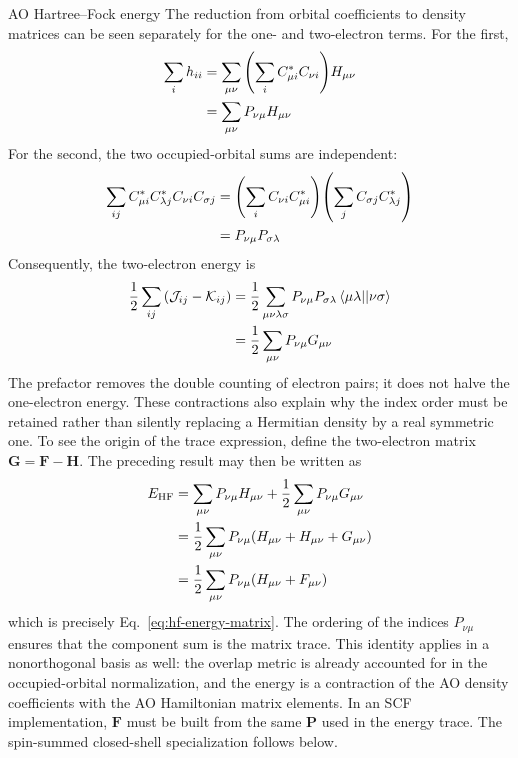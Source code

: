 \documentclass[11pt,a4paper,titlepage]{article}
\numberwithin{equation}{section}
\newcommand{\bF}{\boldsymbol{F}}
\newcommand{\bG}{\boldsymbol{G}}
\newcommand{\bH}{\boldsymbol{H}}
\newcommand{\bP}{\boldsymbol{P}}
\newcommand{\cJ}{\mathcal{J}}
\newcommand{\cK}{\mathcal{K}}
\begin{document}
\begin{hfsolution}{AO Hartree--Fock energy}
The reduction from orbital coefficients to density matrices can be seen
separately for the one- and two-electron terms. For the first,
\begin{equation}
\begin{split}
  \sum_i h_{ii}
  &=\sum_{\mu\nu}\qty(\sum_i C_{\mu i}^*C_{\nu i})H_{\mu\nu}\\
  &=\sum_{\mu\nu}P_{\nu\mu}H_{\mu\nu}
\end{split}
\end{equation}
For the second, the two occupied-orbital sums are independent:
\begin{equation}
\begin{split}
  \sum_{ij}C_{\mu i}^*C_{\lambda j}^*C_{\nu i}C_{\sigma j}
  &=\qty(\sum_i C_{\nu i}C_{\mu i}^*)
    \qty(\sum_j C_{\sigma j}C_{\lambda j}^*)\\
  &=P_{\nu\mu}P_{\sigma\lambda}
\end{split}
\end{equation}
Consequently, the two-electron energy is
\begin{equation}
\begin{split}
  \frac12\sum_{ij}\qty(\cJ_{ij}-\cK_{ij})
  &=\frac12\sum_{\mu\nu\lambda\sigma}
    P_{\nu\mu}P_{\sigma\lambda}\mel{\mu\lambda}{}{\nu\sigma}\\
  &=\frac12\sum_{\mu\nu}P_{\nu\mu}G_{\mu\nu}
\end{split}
\end{equation}
The prefactor removes the double counting of electron pairs; it does not
halve the one-electron energy. These contractions also explain why the
index order must be retained rather than silently replacing a Hermitian
density by a real symmetric one.
To see the origin of the trace expression, define the two-electron matrix
$\bG=\bF-\bH$. The preceding result may then be written as
\begin{equation}
\begin{split}
  E_\text{HF}
  &=
  \sum_{\mu\nu}P_{\nu\mu}H_{\mu\nu}
  +
  \frac12\sum_{\mu\nu}P_{\nu\mu}G_{\mu\nu}
  \\
  &=
  \frac12\sum_{\mu\nu}P_{\nu\mu}
  \qty(H_{\mu\nu}+H_{\mu\nu}+G_{\mu\nu})
  \\
  &=
  \frac12\sum_{\mu\nu}P_{\nu\mu}
  \qty(H_{\mu\nu}+F_{\mu\nu})
\end{split}
\end{equation}
which is precisely Eq.~\eqref{eq:hf-energy-matrix}. The ordering of the
indices $P_{\nu\mu}$ ensures that the component sum is the matrix trace.
This identity applies in a nonorthogonal basis as well: the overlap metric
is already accounted for in the occupied-orbital normalization, and the
energy is a contraction of the AO density coefficients with the AO
Hamiltonian matrix elements. In an SCF implementation, $\bF$ must be built
from the same $\bP$ used in the energy trace. The spin-summed closed-shell
specialization follows below.


\end{hfsolution}
\end{document}
